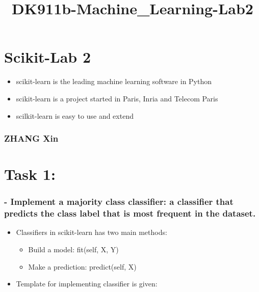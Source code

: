 \documentclass[11pt]{article}
\title{DK911b-Machine\_Learning-Lab2}
\providecommand{\tightlist}{%
      \setlength{\itemsep}{0pt}\setlength{\parskip}{0pt}}
\begin{document}
    
    
    \maketitle
    
    

    
    \section{Scikit-Lab 2}\label{scikit-lab-2}

\begin{itemize}
\tightlist
\item
  scikit-learn is the leading machine learning software in Python
\item
  scikit-learn is a project started in Paris, Inria and Telecom Paris
\item
  scilkit-learn is easy to use and extend
\end{itemize}

    \subsubsection{ZHANG Xin}\label{zhang-xin}

    \section{Task 1:}\label{task-1}

\subsubsection{- Implement a majority class classifier: a classifier
that predicts the class label that is most frequent in the
dataset.}\label{implement-a-majority-class-classifier-a-classifier-that-predicts-the-class-label-that-is-most-frequent-in-the-dataset.}

\begin{itemize}
\tightlist
\item
  Classifiers in scikit-learn has two main methods:

  \begin{itemize}
  \tightlist
  \item
    Build a model: fit(self, X, Y)
  \item
    Make a prediction: predict(self, X)
  \end{itemize}
\item
  Template for implementing classifier is given:
\end{itemize}
\end{document}

